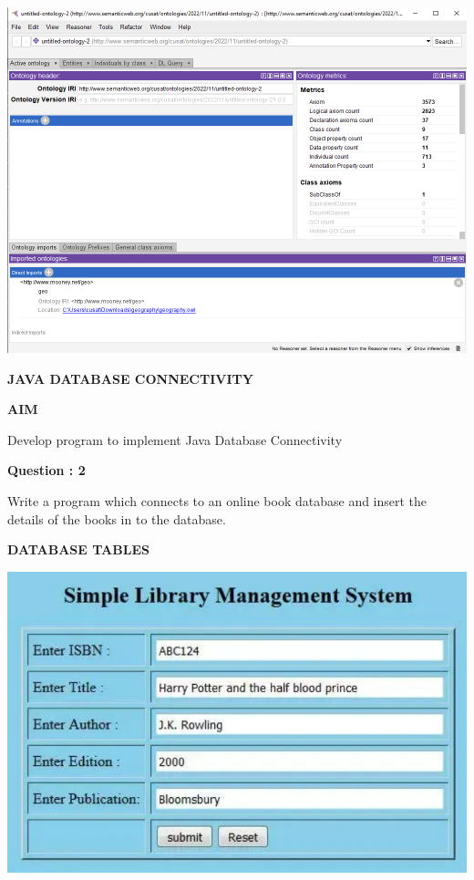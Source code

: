 \documentclass[a4paper,12pt]{report}
\begin{document}
\includegraphics[scale=0.4]{Screenshot 2022-12-15 161435.png}
\newpage
\begin{center}
		\large\textbf{JAVA DATABASE CONNECTIVITY}
	\end{center}
	
	\begin{flushleft}
		\textbf{AIM }
	\end{flushleft} 
Develop program to implement Java 
Database Connectivity

  
\begin{flushleft}
    \textbf{Question : 2}
\end{flushleft}
Write a program which connects to an online book database and insert the details of the
books in to the database.


\begin{flushleft}
\textbf{DATABASE TABLES}
\end{flushleft}
\includegraphics[scale=1]{book.png}
\end{document}
